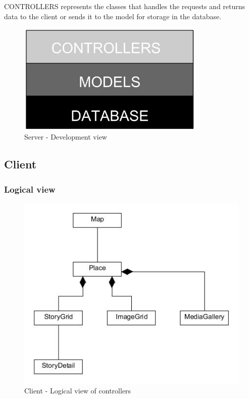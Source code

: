\documentclass[11pt]{book}
\begin{document}
CONTROLLERS represents the classes that handles the requests and returns data to the client or sends it to the model for storage in the database.

\begin{figure}[H]
      \centering
      \includegraphics[width=0.8\textwidth]{Figures/Architecture/serverDevelopment.jpg}
      \caption{Server - Development view}
      \label{fig:arch_server_development}
\end{figure}

\subsection{Client}

\subsubsection{Logical view}

\begin{figure}[H]
      \centering
      \includegraphics[width=1.0\textwidth]{Figures/Architecture/clientLogicalController.jpg}
      \caption{Client - Logical view of controllers}
      \label{fig:arch_client_logical_controllers}
\end{figure}
\end{document}
